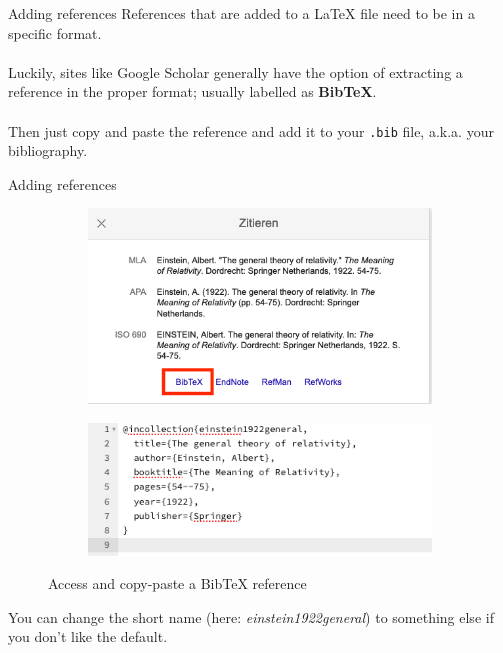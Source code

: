 \documentclass{beamer}
\begin{document}
\begin{frame}[fragile]{Adding references}
References that are added to a LaTeX file need to be in a specific format.\\~\\
\pause
Luckily, sites like Google Scholar generally have the option of extracting a reference in the proper format; usually labelled as \textbf{BibTeX}.\\~\\
\pause
Then just copy and paste the reference and add it to your \verb|.bib| file, a.k.a. your bibliography.
\end{frame}

\begin{frame}{Adding references}
\begin{figure}
     \centering
     \begin{subfigure}[b]{0.45\textwidth}
         \centering
         \includegraphics[width=\textwidth]{einstein_ref.png}
     \end{subfigure}
     \hfill
     \begin{subfigure}[b]{0.45\textwidth}
         \centering
         \includegraphics[width=\textwidth]{einstein_ref2.png}
     \end{subfigure}
     \caption{Access and copy-paste a BibTeX reference}
\end{figure}  
You can change the short name (here: \textit{einstein1922general}) to something else if you don't like the default.
\end{frame}
\end{document}
